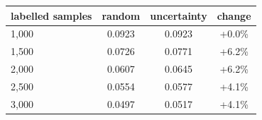 \begin{tabular}{lccc}
\toprule
labelled samples & random & uncertainty & change \\
\midrule
1,000 & 0.0923 & 0.0923 & +0.0\% \\
1,500 & 0.0726 & 0.0771 & +6.2\% \\
2,000 & 0.0607 & 0.0645 & +6.2\% \\
2,500 & 0.0554 & 0.0577 & +4.1\% \\
3,000 & 0.0497 & 0.0517 & +4.1\% \\
\bottomrule
\end{tabular}
